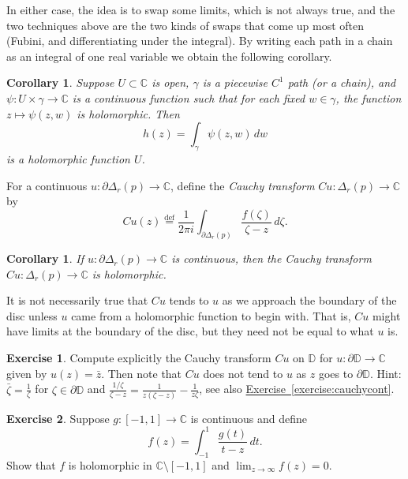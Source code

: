 \documentclass[12pt,openany]{book}
\newcommand{\C}{{\mathbb{C}}}
\newcommand{\D}{{\mathbb{D}}}
\newcommand{\myindex}[1]{#1\index{#1}}
\theoremstyle{plain}
\newtheorem{cor}[thm]{Corollary}
\theoremstyle{remark}
\theoremstyle{definition}
\newenvironment{exbox}{%
    \def\FrameCommand{\vrule width 1pt \relax\hspace{10pt}}%
    \MakeFramed{\advance\hsize-\width\FrameRestore}%
}{%
    \endMakeFramed
}
\theoremstyle{exercise}
\newtheorem{exercise}{Exercise}[section]
\theoremstyle{example}
\newcommand{\exerciseref}[1]{\hyperref[#1]{Exercise~\ref*{#1}}}
\begin{document}
In either case, the idea is to swap some limits, which is not always true,
and the two techniques above are the two kinds of swaps that come up most
often (Fubini, and differentiating under the integral).  By writing each
path in a chain as an integral of one real variable we obtain the following
corollary.

\begin{cor} \label{cor:holfuncbyintegral}
Suppose $U \subset \C$ is open, $\gamma$ is a
piecewise $C^1$ path (or a chain), and
$\psi \colon U \times \gamma \to \C$ is a continuous function such that
for each fixed $w \in \gamma$, the function $z \mapsto \psi(z,w)$ is
holomorphic.  Then
\begin{equation*}
h(z) =
\int_\gamma \psi(z,w) \, dw
\end{equation*}
is a holomorphic function $U$.
\end{cor}

For a continuous $u \colon \partial \Delta_r(p) \to \C$, define
the \emph{\myindex{Cauchy transform}} $Cu \colon \Delta_r(p) \to \C$ by
\begin{equation*}
Cu(z)
\overset{\text{def}}{=}
\frac{1}{2\pi i}
\int_{\partial \Delta_r(p)}
\frac{f(\zeta)}{\zeta-z}\, d\zeta .
\end{equation*}

\begin{cor}
If $u \colon \partial \Delta_r(p) \to \C$ is continuous, then
the Cauchy transform $Cu \colon \Delta_r(p) \to \C$ is holomorphic.
\end{cor}

It is not necessarily true that $Cu$ tends to $u$ as we approach the
boundary of the disc unless $u$ came from 
a holomorphic function to begin with.  That is, $Cu$ might have limits at
the boundary of the disc, but they need not be equal to what $u$ is.

\begin{exbox}
\begin{exercise}
Compute explicitly
the Cauchy transform $Cu$ on $\D$ for $u \colon \partial \D \to \C$
given by $u(z) = \bar{z}$.  Then note that $Cu$ does not tend to $u$
as $z$ goes to $\partial \D$.
Hint: $\bar{\zeta} = \frac{1}{\zeta}$ for
$\zeta \in \partial \D$
and $\frac{1/\zeta}{\zeta-z} = \frac{1}{z(\zeta-z)} - \frac{1}{z \zeta}$,
see also \exerciseref{exercise:cauchycont}.
\end{exercise}

\begin{exercise}
Suppose $g \colon [-1,1] \to \C$ is continuous and define
\begin{equation*}
f(z) = \int_{-1}^1 \frac{g(t)}{t-z} \, dt .
\end{equation*}
Show that $f$ is holomorphic in $\C \setminus [-1,1]$ and
$\lim_{z \to \infty} f(z) = 0$.
\end{exercise}
\end{exbox}
\end{document}
